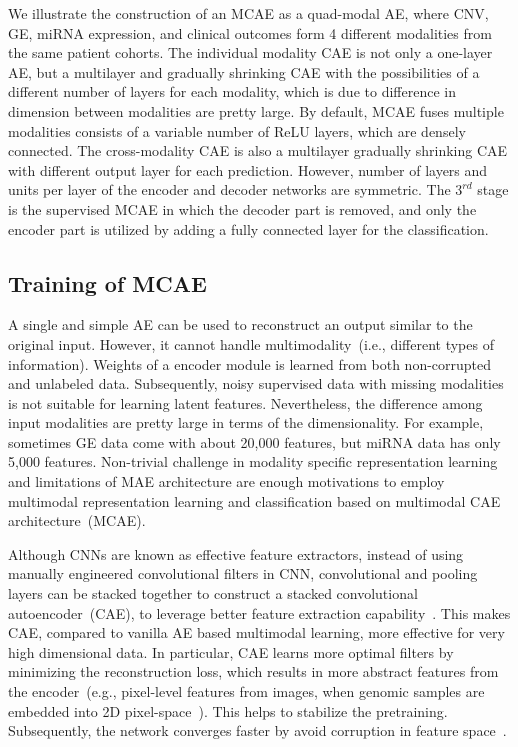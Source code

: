 \hspace*{3.5mm} We illustrate the construction of an MCAE as a quad-modal AE, where CNV, GE, miRNA expression, and clinical outcomes form 4 different modalities from the same patient cohorts. The individual modality CAE is not only a one-layer AE, but a multilayer and gradually shrinking CAE with the possibilities of a different number of layers for each modality, which is due to difference in dimension between modalities are pretty large. By default, MCAE fuses multiple modalities consists of a variable number of ReLU layers, which are densely connected. The cross-modality CAE is also a multilayer gradually shrinking CAE with different output layer for each prediction. However, number of layers and units per layer of the encoder and decoder networks are symmetric. The $3^{rd}$ stage is the supervised MCAE in which the decoder part is removed, and only the encoder part is utilized by adding a fully connected layer for the classification. %
\fi 

\subsection{Training of MCAE}
A single and simple AE can be used to reconstruct an output similar to the original input. However, it cannot handle multimodality~(i.e., different types of information). Weights of a encoder module is learned from both non-corrupted and unlabeled data. Subsequently, noisy supervised data with missing modalities is not suitable for learning latent features. Nevertheless, the difference among input modalities are pretty large in terms of the dimensionality. For example, sometimes GE data come with about 20,000 features, but miRNA data has only 5,000 features. Non-trivial challenge in modality specific representation learning and limitations of MAE architecture are enough motivations to employ multimodal representation learning and classification based on multimodal CAE architecture~(MCAE). 

\hspace*{3.5mm} Although CNNs are known as effective feature extractors, instead of using manually engineered convolutional filters in CNN, convolutional and pooling layers can be stacked together to construct a stacked convolutional autoencoder~(CAE), to leverage better feature extraction capability~\cite{alirezaie2019semantic}. This makes CAE, compared to vanilla AE based multimodal learning, more effective for very high dimensional data. In particular, CAE learns more optimal filters by minimizing the reconstruction loss, which results in more abstract features from the encoder~(e.g., pixel-level features from images, when genomic samples are embedded into 2D pixel-space~\cite{mostavi2019convolutional}). This helps to stabilize the pretraining. Subsequently, the network converges faster by avoid corruption in feature space~\cite{guo2017deep}. 

